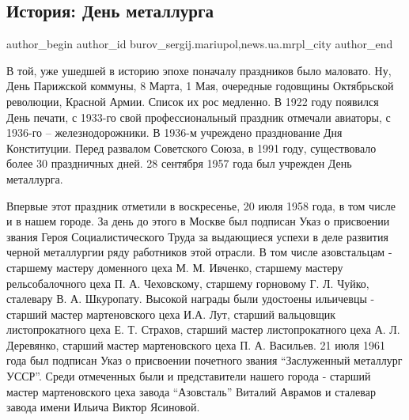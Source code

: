  
 
 
 
 
 
\subsection{История: День металлурга}
\label{sec:16_07_2017.stz.news.ua.mrpl_city.1.istoria_den_metallurga}
 
\ifcmt
 author_begin
   author_id burov_sergij.mariupol,news.ua.mrpl_city
 author_end
\fi

В той, уже ушедшей в историю эпохе поначалу праздников было маловато. Ну, День
Парижской коммуны, 8 Марта, 1 Мая, очередные годовщины Октябрьской революции,
Красной Армии. Список их рос медленно. В 1922 году появился День печати, с
1933-го свой профессиональный праздник отмечали авиаторы, с 1936-го –
железнодорожники. В 1936-м учреждено празднование Дня Конституции. Перед
развалом Советского Союза, в 1991 году, существовало более 30 праздничных дней.
28 сентября 1957 года был учрежден День металлурга.

Впервые этот праздник отметили в воскресенье, 20 июля 1958 года, в том числе и
в нашем городе. За день до этого в Москве был подписан Указ о присвоении
звания Героя Социалистического Труда за выдающиеся успехи в деле развития
черной металлургии ряду работников этой отрасли. В том числе азовстальцам -
старшему мастеру доменного цеха М. М. Ивченко, старшему мастеру рельсобалочного
цеха П. А. Чеховскому, старшему горновому Г. Л. Чуйко, сталевару В. А. Шкуропату.
Высокой награды были удостоены ильичевцы - старший мастер мартеновского цеха
И.А. Лут, старший вальцовщик листопрокатного цеха Е. Т. Страхов, старший мастер
листопрокатного цеха А. Л. Деревянко, старший  мастер мартеновского цеха П. А.
Васильев. 21 июля 1961 года был подписан Указ о присвоении почетного звания
\enquote{Заслуженный металлург УССР}. Среди отмеченных были и представители нашего
города - старший мастер мартеновского цеха завода \enquote{Азовсталь} Виталий  Аврамов
и сталевар завода имени Ильича Виктор Ясиновой.

